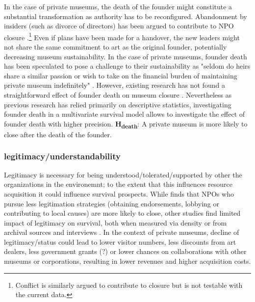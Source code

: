 \documentclass[11pt]{article}
\begin{document}
In the case of private museums, the death of the founder might constitute a substantial transformation as authority has to be reconfigured.
Abandonment by insiders (such as divorce of directors) has been argued to contribute to NPO closure \parencite{Duckles_Hager_Galaskiewicz_2005_close}.\footnote{Conflict is similarly argued to contribute to closure but is not testable with the current data.}
Even if plans have been made for a handover, the new leaders might not share the same commitment to art as the original founder, potentially decreasing museum sustainability. 
In the case of private museums, founder death has been speculated to pose a challenge to their sustainability as "seldom do heirs share a similar passion or wish to take on the financial burden of maintaining private museum indefinitely" \parencite[p.234]{Walker_2019_collector}.
However, existing research has not found a straightforward effect of founder death on museum closure \parencite{Velthuis_Gera_forthcoming_fragility,Velthuis_etal_2023_boom}.
Nevertheless as previous research has relied primarily on descriptive statistics, investigating founder death in a multivariate survival model allows to investigate the effect of founder death with higher precision.
\bigbreak
\noindent
\textbf{H\textsubscript{death}}: A private museum is more likely to close after the death of the founder.


\subsubsection*{legitimacy/understandability}

Legitimacy is necessary for being understood/tolerated/supported by other the organizations in the environemnt; to the extent that this influences resource acquisition it could influence survival prospects.
While \textcite{Bielefeld_1994_survival} finds that NPOs who pursue less legitimation strategies (obtaining endorsements, lobbying or contributing to local causes) are more likely to close, other studies find limited impact of legitimacy on survival, both when measured via density \parencite{Bogaert_etal_2014_ecological} or from archival sources and interviews \parencite{Fernandez_2007_dissolution}.
In the context of private museums, decline of legitimacy/status could lead to lower visitor numbers, less discounts from art dealers, less government grants (?) or lower chances on collaborations with other museums or corporations, resulting in lower revenues and higher acquisition costs.
\end{document}

